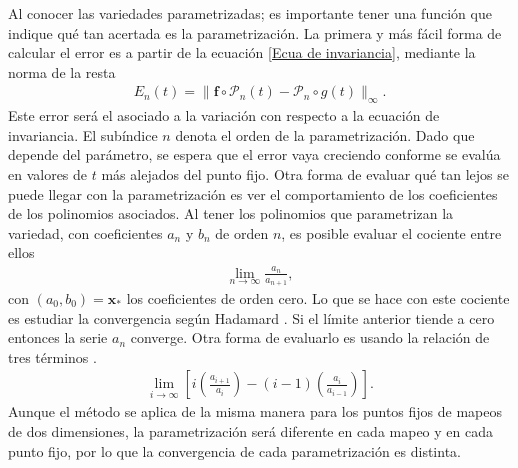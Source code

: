 Al conocer las variedades parametrizadas; es importante tener una función que indique qué tan acertada es la parametrización. La primera y más fácil forma de calcular el error es a partir de la ecuación \eqref{Ecua de invariancia}, mediante la norma de la resta
\begin{eqnarray}
E_{n}(t) = \parallel \mathbf{f} \circ \mathcal{P}_{n}(t) - \mathcal{P}_{n} \circ g(t) \parallel_{\infty}.  \label{Ecua de invariancia resta}
\end{eqnarray}
Este error será el asociado a la variación con respecto a la ecuación de invariancia. El subíndice $n$ denota el orden de la parametrización. Dado que depende del parámetro, se espera que el error vaya creciendo conforme se evalúa en valores de $t$ más alejados del punto fijo. Otra forma de evaluar qué tan lejos se puede llegar con la parametrización es ver el comportamiento de los coeficientes de los polinomios asociados. Al tener los polinomios que parametrizan la variedad, con coeficientes $a_{n}$ y $b_{n}$ de orden $n$, es posible evaluar el cociente entre ellos
\begin{eqnarray}
\lim_{n\rightarrow\infty}\frac{a_{n}}{a_{n+1}},\label{hadamard}
\end{eqnarray} 
con $(a_{0},b_{0})=\mathbf{x}_{*}$ los coeficientes de orden cero. Lo que se hace con este cociente es estudiar la convergencia según Hadamard \citep{lang}. Si el límite anterior tiende a cero entonces la serie $a_{n}$ converge. Otra forma de evaluarlo es usando la relación de tres términos \citep{Chang}.
\begin{eqnarray}
\lim_{i\rightarrow\infty} \left[ i\left(\frac{a_{i+1}}{a_{i}}\right)-(i-1)\left(\frac{a_{i}}{a_{i-1}}\right) \right].
\label{tres terminos}
\end{eqnarray}
Aunque el método se aplica de la misma manera para los puntos fijos de mapeos de dos dimensiones, la parametrización será diferente en cada mapeo y en cada punto fijo, por lo que la convergencia de cada parametrización es distinta. 
